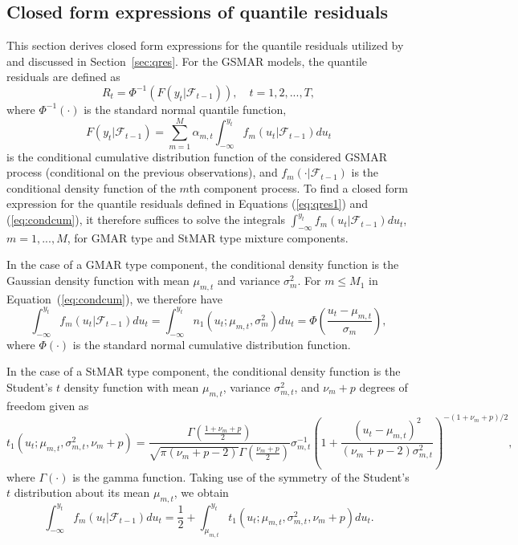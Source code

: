 \documentclass[nojss]{jss} %
\begin{document}
\begin{appendix}
\section{Closed form expressions of quantile residuals}\label{sec:qresexpr}
This section derives closed form expressions for the quantile residuals utilized by  and discussed in Section~\ref{sec:qres}. For the GSMAR models, the quantile residuals are defined as
%
\begin{equation}\label{eq:qres1}
R_t=\Phi^{-1}(F(y_t|\mathcal{F}_{t-1})), \quad t=1,2,...,T,
\end{equation}
%
where $\Phi^{-1}(\cdot)$ is the standard normal quantile function,
%
\begin{equation}\label{eq:condcum}
F(y_t|\mathcal{F}_{t-1})= \sum_{m=1}^M\alpha_{m,t}\int_{-\infty}^{y_t} f_m(u_t|\mathcal{F}_{t-1})du_t
\end{equation}
%
is the conditional cumulative distribution function of the considered GSMAR process (conditional on the previous observations),
and $f_m(\cdot|\mathcal{F}_{t-1})$ is the conditional density function of the $m$th component process. To find a closed form expression for the quantile residuals defined in Equations (\ref{eq:qres1}) and (\ref{eq:condcum}), it therefore suffices to solve the integrals $\int_{-\infty}^{y_t} f_m(u_t|\mathcal{F}_{t-1})du_t$, $m=1,...,M$, for GMAR type and StMAR type mixture components.
%

In the case of a GMAR type component, the conditional density function is the Gaussian density function with mean $\mu_{m,t}$ and variance $\sigma_m^2$. For $m\leq M_1$ in Equation~(\ref{eq:condcum}), we therefore have
%
\begin{equation}
\int_{-\infty}^{y_t} f_m(u_t|\mathcal{F}_{t-1})du_t = \int_{-\infty}^{y_t}n_1(u_t;\mu_{m,t},\sigma_m^2) du_t= \Phi\left(\frac{u_t - \mu_{m,t}}{\sigma_m}\right),
\end{equation}
%
where $\Phi (\cdot)$ is the standard normal cumulative distribution function.

In the case of a StMAR type component, the conditional density function is the Student's $t$ density function with mean $\mu_{m,t}$, variance $\sigma_{m,t}^2$, and $\nu_m + p$ degrees of freedom given as \cite[Appendix A]{Meitz+Preve+Saikkonen:2021}
%
\begin{equation}
t_1(u_t;\mu_{m,t},\sigma_{m,t}^2,\nu_m+p) = \frac{\Gamma\left(\frac{1 + \nu_m + p}{2}\right)}{\sqrt{\pi(\nu_m + p - 2)}\Gamma\left(\frac{\nu_m + p}{2}\right)}\sigma_{m,t}^{-1}\left(1 + \frac{(u_t - \mu_{m,t})^2}{(\nu_m + p - 2)\sigma_{m,t}^2} \right)^{-(1 + \nu_m + p)/2},
\end{equation}
%
where $\Gamma\left(\cdot\right)$ is the gamma function. Taking use of the symmetry of the Student's $t$ distribution about its mean $\mu_{m,t}$, we obtain
%
\begin{equation}\label{eq:int1}
\int_{-\infty}^{y_t} f_m(u_t|\mathcal{F}_{t-1})du_t = \frac{1}{2} + \int_{\mu_{m,t}}^{y_t}t_1(u_t;\mu_{m,t},\sigma_{m,t}^2,\nu_m+p) du_t.
\end{equation}
%


\end{appendix}
\end{document}
